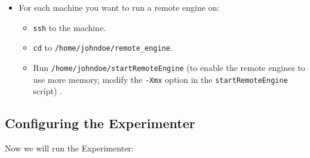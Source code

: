 \begin{itemize}
\begin{itemize}
         \item For each machine you want to run a remote engine on:
         	\begin{itemize}
         		\item \texttt{ssh} to the machine.
               \item \texttt{cd} to \texttt{/home/johndoe/remote\_engine}.
               \item Run \texttt{/home/johndoe/startRemoteEngine} (to enable the remote engines to use more memory, modify the \texttt{-Xmx} option in the \texttt{startRemoteEngine} script) .
            \end{itemize}
      \end{itemize}
\end{itemize}


\subsection{Configuring the Experimenter}

Now we will run the Experimenter:


